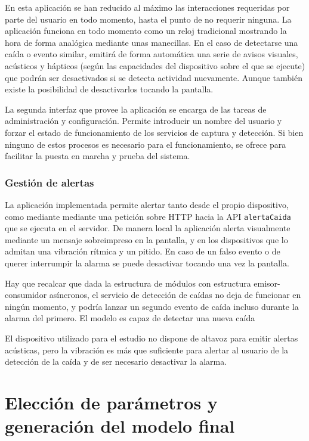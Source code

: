 En esta aplicación se han reducido al máximo las interacciones requeridas por parte del usuario en todo momento, hasta el punto de no requerir ninguna. La aplicación funciona en todo momento como un reloj tradicional mostrando la hora de forma analógica mediante unas manecillas. En el caso de detectarse una caída o evento similar, emitirá de forma automática una serie de avisos visuales, acústicos y hápticos (según las capacidades del dispositivo sobre el que se ejecute) que podrán ser desactivados si se detecta actividad nuevamente. Aunque también existe la posibilidad de desactivarlos tocando la pantalla.

La segunda interfaz que provee la aplicación se encarga de las tareas de administración y configuración. Permite introducir un nombre del usuario y forzar el estado de funcionamiento de los servicios de captura y detección. Si bien ninguno de estos procesos es necesario para el funcionamiento, se ofrece para facilitar la puesta en marcha y prueba del sistema.

\subsubsection{Gestión de alertas}

La aplicación implementada permite alertar tanto desde el propio dispositivo, como mediante mediante una petición sobre HTTP hacia la API \texttt{alertaCaida} que se ejecuta en el servidor. De manera local la aplicación alerta visualmente mediante un mensaje sobreimpreso en la pantalla, y en los dispositivos que lo admitan una vibración rítmica y un pitido. En caso de un falso evento o de querer interrumpir la alarma se puede desactivar tocando una vez la pantalla. 

Hay que recalcar que dada la estructura de módulos con estructura emisor-consumidor asíncronos, el servicio de detección de caídas no deja de funcionar en ningún momento, y podría lanzar un segundo evento de caída incluso durante la alarma del primero. El modelo es capaz de detectar una nueva caída 

El dispositivo utilizado para el estudio no dispone de altavoz para emitir alertas acústicas, pero la vibración es más que suficiente para alertar al usuario de la detección de la caída y de ser necesario desactivar la alarma.






\section{Elección de parámetros y generación del modelo final}

